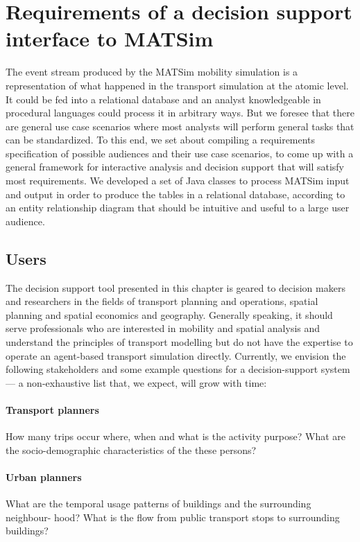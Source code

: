 \section{Requirements of a decision support interface to MATSim}
\label{sec:analyticsRequirements}
The event stream produced by the MATSim mobility simulation is a representation of what happened in the transport simulation at the atomic level. It could be fed into a relational database and an analyst knowledgeable in procedural languages could process it in arbitrary ways. But we foresee that there are general use case scenarios where most analysts will perform general tasks that can be standardized. To this end, we set about compiling a requirements specification of possible audiences and their use case scenarios, to come up with a general framework for interactive analysis and decision support that will satisfy most requirements. We developed a set of Java classes to process MATSim input and output in order to produce the tables in a relational database, according to an entity relationship diagram that should be intuitive and useful to a large user audience.

\subsection{Users}
The decision support tool presented in this chapter is geared to decision makers and researchers
in the fields of transport planning and operations, spatial planning and spatial economics and
geography. Generally speaking, it should serve professionals who are interested in mobility
and spatial analysis and understand the principles of transport modelling but do not have the
expertise to operate an agent-based transport simulation directly. Currently, we envision the
following stakeholders and some example questions for a decision-support system --- a non-exhaustive list that, we expect, will grow with time:
\paragraph{Transport planners}
How many trips occur where, when and what is the activity purpose?
What are the socio-demographic characteristics of the these persons?
\paragraph{Urban planners}
What are the temporal usage patterns of buildings and the surrounding neighbour-
hood?
What is the flow from public transport stops to surrounding buildings?

